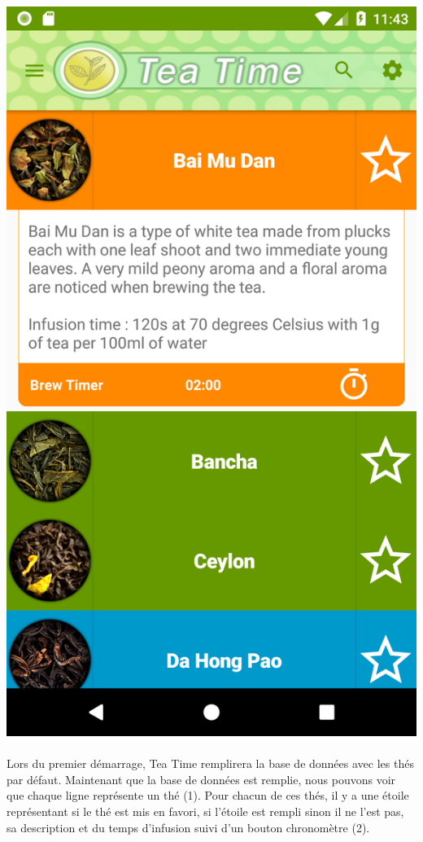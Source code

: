 \documentclass[a4paper,12pt]{article}
\begin{document}
\begin{spacing}{1}
	\includegraphics*[scale=0.1]{Screenshot/02.png}\\\\      
	Lors du premier démarrage, Tea Time remplirera la base de données avec les thés par défaut. 
	Maintenant que la base de données est remplie, nous pouvons voir que chaque ligne représente un thé (1). Pour chacun de ces thés, il y a une étoile représentant si le thé est mis en favori, si l'étoile est rempli sinon il ne l'est pas, sa description et du temps d'infusion suivi d'un bouton chronomètre (2).\\\\

\end{spacing}
\end{document}
